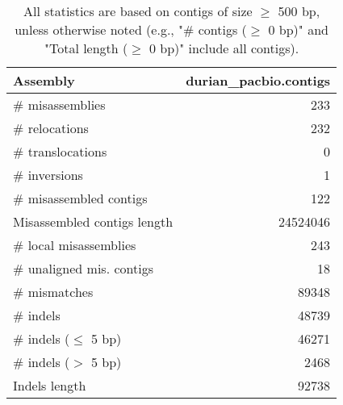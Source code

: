 \documentclass[12pt,a4paper]{article}
\begin{document}
\begin{table}[ht]
\begin{center}
\caption{All statistics are based on contigs of size $\geq$ 500 bp, unless otherwise noted (e.g., "\# contigs ($\geq$ 0 bp)" and "Total length ($\geq$ 0 bp)" include all contigs).}
\begin{tabular}{|l*{1}{|r}|}
\hline
Assembly & durian\_pacbio.contigs \\ \hline
\# misassemblies & 233 \\ \hline
\hspace{5mm}\# relocations & 232 \\ \hline
\hspace{5mm}\# translocations & 0 \\ \hline
\hspace{5mm}\# inversions & 1 \\ \hline
\# misassembled contigs & 122 \\ \hline
Misassembled contigs length & 24524046 \\ \hline
\# local misassemblies & 243 \\ \hline
\# unaligned mis. contigs & 18 \\ \hline
\# mismatches & 89348 \\ \hline
\# indels & 48739 \\ \hline
\hspace{5mm}\# indels ($\leq$ 5 bp) & 46271 \\ \hline
\hspace{5mm}\# indels ($>$ 5 bp) & 2468 \\ \hline
Indels length & 92738 \\ \hline
\end{tabular}
\end{center}
\end{table}
\end{document}
